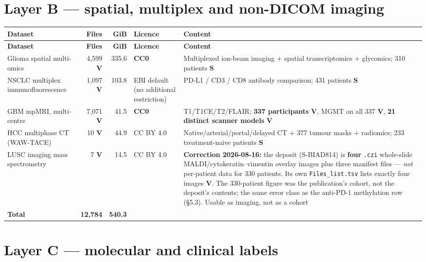 \documentclass[11pt,a4paper]{article}
\newcommand{\ver}{\textcolor{qgreen}{\textbf{V}}}
\newcommand{\src}{\textcolor{qgrey}{\textbf{S}}}
\begin{document}
\section{Layer B --- spatial, multiplex and non-DICOM imaging}

\begin{center}
\small
\begin{longtable}{@{}p{5.1cm}rrp{3.0cm}p{3.4cm}@{}}
\toprule
\textbf{Dataset} & \textbf{Files} & \textbf{GiB} & \textbf{Licence} & \textbf{Content} \\
\midrule
\endfirsthead
\toprule \textbf{Dataset} & \textbf{Files} & \textbf{GiB} & \textbf{Licence} &
\textbf{Content} \\ \midrule
\endhead
\bottomrule
\endfoot
Glioma spatial multi-omics & 4{,}599 \ver & 335.6 & \textbf{CC0} & Multiplexed ion-beam
imaging $+$ spatial transcriptomics $+$ glycomics; 310 patients \src \\
NSCLC multiplex immunofluorescence & 1{,}097 \ver & 103.8 & EBI default (no additional
restriction) & PD-L1 / CD3 / CD8 antibody comparison; 431 patients \src \\
GBM mpMRI, multi-centre & 7{,}071 \ver & 41.5 & \textbf{CC0} & T1/T1CE/T2/FLAIR;
\textbf{337 participants} \ver, MGMT on all 337 \ver, \textbf{21 distinct scanner
models} \ver \\
HCC multiphase CT (WAW-TACE) & 10 \ver & 44.9 & CC BY 4.0 & Native/arterial/portal/delayed
CT $+$ 377 tumour masks $+$ radiomics; 233 treatment-naive patients \src \\
LUSC imaging mass spectrometry & 7 \ver & 14.5 & CC BY 4.0 & \textcolor{qred}{\textbf{Correction
2026-08-16:}} the deposit (S-BIAD814) is \textbf{four} \texttt{.czi} whole-slide
MALDI/cytokeratin--vimentin overlay images plus three manifest files --- \emph{not}
per-patient data for 330 patients. Its own \texttt{Files\_list.tsv} lists exactly four
images \ver. The 330-patient figure was the publication's cohort, not the deposit's
contents; the same error class as the anti-PD-1 methylation row (\S5.3). Usable as imaging,
not as a cohort \\
\midrule
\textbf{Total} & \textbf{12{,}784} & \textbf{540.3} & & \\
\end{longtable}
\end{center}

\section{Layer C --- molecular and clinical labels}
\end{document}
